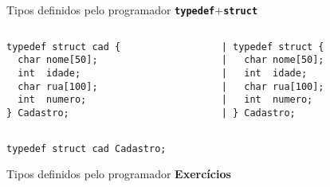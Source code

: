 \documentclass[10pt]{beamer}
\begin{document}
\begin{frame}[fragile]{Tipos definidos pelo programador}
    \huge \textbf{\texttt{typedef}$+$\texttt{struct}}

    \bigskip

    \large
    \begin{columns}
    \begin{column}{0.40\textwidth}
        \begin{verbatim}
typedef struct cad {
  char nome[50];
  int  idade;
  char rua[100];
  int  numero;
} Cadastro;
        \end{verbatim}
    \end{column}
    \begin{column}{0.50\textwidth}
        \begin{verbatim}
| typedef struct {
|   char nome[50];
|   int  idade;
|   char rua[100];
|   int  numero;
| } Cadastro;
        \end{verbatim}
    \end{column}
    \end{columns}

    \begin{verbatim}
typedef struct cad Cadastro;
    \end{verbatim}
\end{frame}

\begin{frame}[fragile]{Tipos definidos pelo programador}
    \huge \textbf{Exercícios}
\end{frame}
\end{document}
